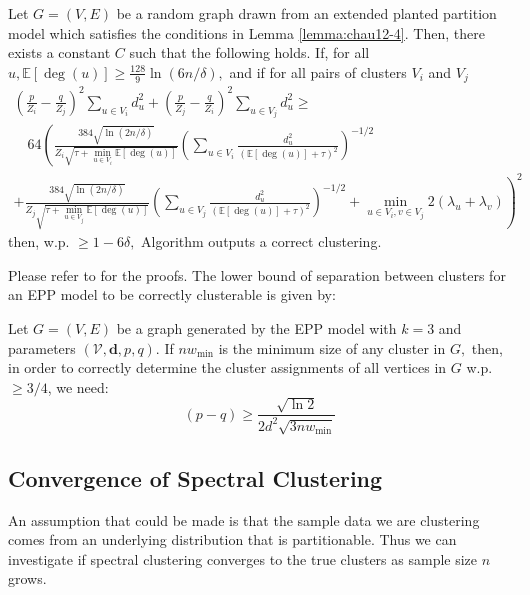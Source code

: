 {	\begin{theorem}
		Let $G=(V, E)$ be a random graph drawn from an extended planted partition model which satisfies the conditions in Lemma \ref{lemma:chau12-4}. Then, there exists a constant $C$ such that the following holds. If, for all $u, \mathbb{E}[\operatorname{deg}(u)] \geq \frac{128}{9} \ln (6 n / \delta),$ and if for all pairs of clusters $V_{i}$ and $V_{j}$
		$$
		\begin{array}{c}
		\left(\frac{p}{Z_{i}}-\frac{q}{Z_{j}}\right)^{2} \sum_{u \in V_{i}} d_{u}^{2}+\left(\frac{p}{Z_{j}}-\frac{q}{Z_{i}}\right)^{2} \sum_{u \in V_{j}} d_{u}^{2} \geq \\
		\quad 64\left(\frac{384 \sqrt{\ln (2 n / \delta)}}{Z_{i} \sqrt{\tau+\min _{u \in V_{i}} \mathbb{E}[\operatorname{deg}(u)]}}\left(\sum_{u \in V_{i}} \frac{d_{u}^{2}}{(\mathbb{E}[\operatorname{deg}(u)]+\tau)^{2}}\right)^{-1 / 2}\right. \\
		\left.+\frac{384 \sqrt{\ln (2 n / \delta)}}{Z_{j} \sqrt{\tau+\min _{u \in V_{j}} \mathbb{E}[\operatorname{deg}(u)]}}\left(\sum_{u \in V_{j}} \frac{d_{u}^{2}}{(\mathbb{E}[\operatorname{deg}(u)]+\tau)^{2}}\right)^{-1 / 2}+\min _{u \in V_{i}, v \in V_{j}} 2\left(\lambda_{u}+\lambda_{v}\right)\right)^{2}
		\end{array}
		$$
		then, w.p. $\geq 1-6 \delta,$ Algorithm outputs a correct clustering.
	\end{theorem}
	
	Please refer to \cite{chau12} for the proofs. The lower bound of separation between clusters for an EPP model to be correctly clusterable is given by:
	
	\begin{theorem}
		Let $G=(V, E)$ be a graph generated by the EPP model with $k=3$ and parameters $(\mathcal{V}, \boldsymbol{d}, p, q) .$ If $n w_{\min }$ is the minimum size of any cluster in $G,$ then, in order to correctly determine the cluster assignments of all vertices in $G$ w.p. $\geq 3 / 4$, we need:
		$$
		(p-q) \geq \frac{\sqrt{\ln 2}}{2 d^{2} \sqrt{3 n w_{\min }}}
		$$
	\end{theorem}
	
	\subsection{Convergence of Spectral Clustering}
	
	An assumption that could be made is that the sample data we are clustering comes from an underlying distribution that is partitionable. Thus we can investigate if spectral clustering converges to the true clusters as sample size $n$ grows.
	
}
